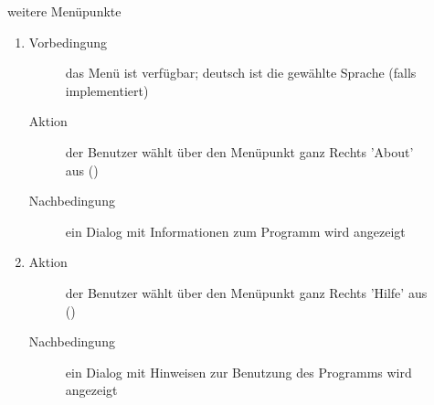 \begin{description}
	\item[] weitere Menüpunkte
	\begin{enumerate}
		\item
		\begin{description}
			\item[Vorbedingung] das Menü ist verfügbar; deutsch ist die gewählte Sprache (falls  implementiert)
			\item[Aktion] der Benutzer wählt über den Menüpunkt ganz Rechts 'About' aus ()
			\item[Nachbedingung] ein Dialog mit Informationen zum Programm wird angezeigt
		\end{description}
		\item
		\begin{description}
			\item[Aktion] der Benutzer wählt über den Menüpunkt ganz Rechts 'Hilfe' aus ()
			\item[Nachbedingung] ein Dialog mit Hinweisen zur Benutzung des Programms wird angezeigt
		\end{description}
	\end{enumerate}
\end{description}
\pagebreak